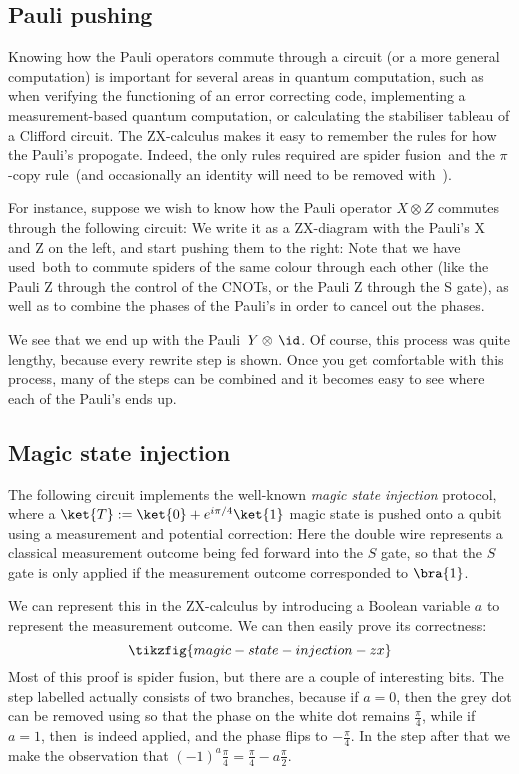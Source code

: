 \documentclass[a4paper,onecolumn,superscriptaddress,11pt,%
				unpublished,%
				allowfontchageintitle,%
				]{quantumarticle}
\begin{document}
\subsection{Pauli pushing}

Knowing how the Pauli operators commute through a circuit (or a more general computation) is important for several areas in quantum computation, such as when verifying the functioning of an error correcting code, implementing a measurement-based quantum computation, or calculating the stabiliser tableau of a Clifford circuit.
The ZX-calculus makes it easy to remember the rules for how the Pauli's propogate. Indeed, the only rules required are spider fusion~\SpiderRule and the $\pi$-copy rule~\CopyRule (and occasionally an identity will need to be removed with~\IdRule).

For instance, suppose we wish to know how the Pauli operator $X\otimes Z$ commutes through the following circuit:
We write it as a ZX-diagram with the Pauli's X and Z on the left, and start pushing them to the right:
Note that we have used~\SpiderRule both to commute spiders of the same colour through each other (like the Pauli Z through the control of the CNOTs, or the Pauli Z through the S gate), as well as to combine the phases of the Pauli's in order to cancel out the phases.

We see that we end up with the Pauli~$Y\otimes \,\id$. Of course, this process was quite lengthy, because every rewrite step is shown. Once you get comfortable with this process, many of the steps can be combined and it becomes easy to see where each of the Pauli's ends up.

\subsection{Magic state injection}
The following circuit implements the well-known \emph{magic state injection} protocol, where a $\ket{T}:=\ket{0}+e^{i\pi/4}\ket{1}$ magic state is pushed onto a qubit using a measurement and potential correction:
Here the double wire represents a classical measurement outcome being fed forward into the $S$ gate, so that the $S$ gate is only applied if the measurement outcome corresponded to $\bra{1}$.

We can represent this in the ZX-calculus by introducing a Boolean variable $a$ to represent the measurement outcome. We can then easily prove its correctness:
\begin{equation}
\tikzfig{magic-state-injection-zx}
\end{equation}
Most of this proof is spider fusion, but there are a couple of interesting bits. The step labelled \PiRule actually consists of two branches, because if $a=0$, then the grey dot can be removed using \IdRule so that the phase on the white dot remains $\frac\pi4$, while if~$a=1$, then~\PiRule is indeed applied, and the phase flips to $-\frac\pi4$. In the step after that we make the observation that $(-1)^a\frac\pi4 = \frac\pi4 -a\frac\pi2$.
\end{document}
